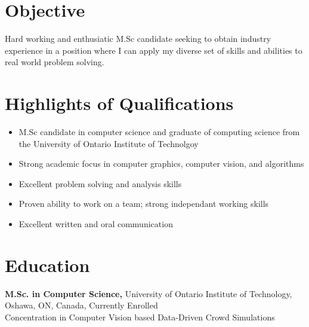 \documentclass[margin]{res}
\begin{document}
 
 
 
\address{{\bf Present Address} \\ 918 King St. E \\ Oshawa, ON, Canada L1H 1H2  \\
        (289) 404-0333 (cell) }
\address{{\bf Permanent Address} \\ 30 Mitchell Ave. \\ Alliston, ON, Canada L9R 1C9 \\
        (705) 435-7416 }

 
\begin{resume} 
 
\section{Objective} 
Hard working and enthusiatic M.Sc candidate seeking to obtain industry experience in a position where I can apply my diverse set of skills and abilities to real world problem solving.

\section{Highlights of Qualifications}
\begin{itemize} \itemsep -2pt
\item M.Sc candidate in computer science and graduate of computing science from the University of Ontario Institute of Technolgoy
\item Strong academic focus in computer graphics, computer vision, and algorithms
\item Excellent problem solving and analysis skills
\item Proven ability to work on a team; strong independant working skills
\item Excellent written and oral communication
\end{itemize}

\section{Education} 
{\bf M.Sc. in Computer Science,} University of Ontario Institute of Technology, \\
Oshawa, ON, Canada, Currently Enrolled \\
Concentration in Computer Vision based Data-Driven Crowd Simulations


\end{resume}
\end{document}
